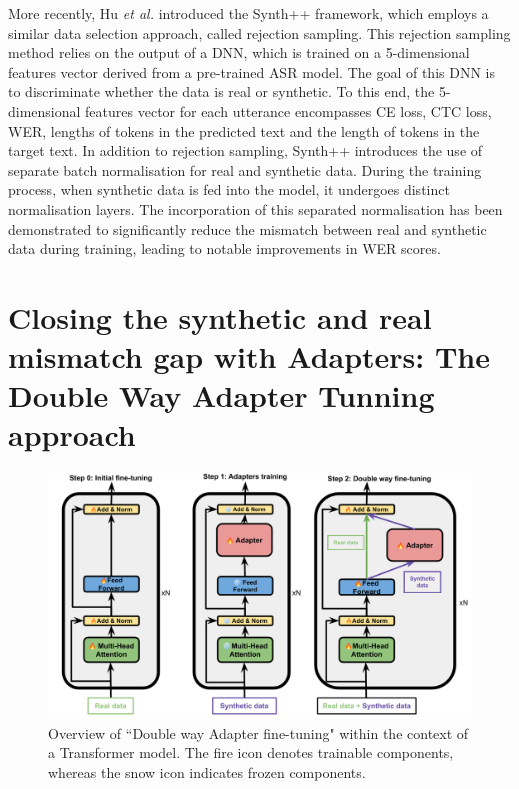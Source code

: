More recently, Hu \textit{et al.} \cite{hu2022synt++} introduced the Synth++ framework, which employs a similar data selection approach, called rejection sampling. This rejection sampling method relies on the output of a \ac{DNN}, which is trained on a 5-dimensional features vector derived from a pre-trained \ac{ASR} model. The goal of this \ac{DNN} is to discriminate whether the data is real or synthetic. To this end, the 5-dimensional features vector for each utterance encompasses \ac{CE} loss, \ac{CTC} loss, \ac{WER}, lengths of tokens in the predicted text and the length of tokens in the target text. In addition to rejection sampling, Synth++ introduces the use of separate batch normalisation for real and synthetic data. During the training process, when synthetic data is fed into the model, it undergoes distinct normalisation layers. The incorporation of this separated normalisation has been demonstrated to significantly reduce the mismatch between real and synthetic data during training, leading to notable improvements in \ac{WER} scores.

\section{Closing the synthetic and real mismatch gap with Adapters: The Double Way Adapter Tunning approach}

\begin{figure}
    \centering
    \includegraphics[width=\textwidth]{imgs/TTS_Transformer.png}
    \caption{Overview of ``Double way Adapter fine-tuning"  within the context of a Transformer model. The fire icon denotes trainable components, whereas the snow icon indicates frozen components.}
    \label{fig:overall_DWAT}
\end{figure}

